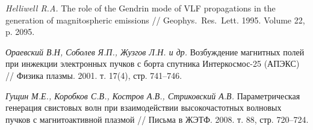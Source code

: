 \documentclass[10pt]{disser}
\begin{document}
\begin{thebibliography}{99}
\textit{Helliwell R.A.} The role of the Gendrin mode of VLF propagations in the generation of magnitospheric emissions // Geophys.~Res.~Lett. 1995. Volume 22, p. 2095. %

\textit{Ораевский В.Н, Соболев Я.П., Жузгов Л.Н. и др.} Возбуждение магнитных полей при инжекции электронных пучков с борта спутника Интеркосмос-25 (АПЭКС) // Физика плазмы. 2001. т. 17(4), стр. 741--746. %

\textit{Гущин М.Е., Коробков С.В., Костров А.В., Стриковский А.В.} 
Параметрическая генерация свистовых волн при взаимодействии высокочастотных волновых пучков с магнитоактивной плазмой // Письма в ЖЭТФ. 2008. т. 88, стр. 720--724.

\end{thebibliography}
\end{document}
